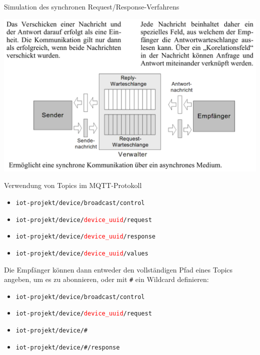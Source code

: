 \begin{frame}{Simulation des synchronen Request/Response-Verfahrens }
    \begin{center}
        \includegraphics[width=\linewidth]{06-architektur/img/mqtt7}
    \end{center}
\end{frame}

{
\small

\begin{frame}{Verwendung von Topics im MQTT-Protokoll}

    \smallskip

    \begin{itemize}
        \item \texttt{iot-projekt/device/broadcast/control}
        \item \texttt{iot-projekt/device/\textcolor{red}{device\_uuid}/request}
        \item \texttt{iot-projekt/device/\textcolor{red}{device\_uuid}/response}
        \item \texttt{iot-projekt/device/\textcolor{red}{device\_uuid}/values}
    \end{itemize}

    \medskip

    Die Empfänger können dann entweder den vollständigen Pfad eines Topics
    angeben, um es zu abonnieren, oder mit \texttt{\#} ein Wildcard definieren:

    \smallskip

    \begin{itemize}
        \item \texttt{iot-projekt/device/broadcast/control}
        \item \texttt{iot-projekt/device/\textcolor{red}{device\_uuid}/request}
        \item \texttt{iot-projekt/device/\#}
        \item \texttt{iot-projekt/device/\#/response}
    \end{itemize}
\end{frame}
}

